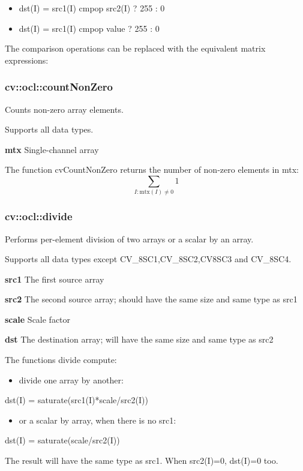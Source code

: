 \documentclass{article}
\begin{document}
\begin{itemize}
\item dst(I) = src1(I) cmpop src2(I) ? 255 : 0
\item dst(I) = src1(I) cmpop value ? 255 : 0
\end{itemize}

The comparison operations can be replaced with the equivalent matrix
expressions:

\newpage

\subsubsection{cv::ocl::countNonZero }
\label{subsubsec:mylabel12}
Counts non-zero array elements.

Supports all data types.

\textbf{mtx }Single-channel array

The function cvCountNonZero returns the number of non-zero elements in mtx:
\[
\sum\limits_{I:\mbox{mtx}(I)\ne 0} 1
\]
\newpage

\subsubsection{cv::ocl::divide}
\label{subsubsec:mylabel13}
Performs per-element division of two arrays or a scalar by an array.

Supports all data types except CV{\_}8SC1,CV{\_}8SC2,CV8SC3 and CV{\_}8SC4.

\textbf{src1 }The first source array

\textbf{src2 }The second source array; should have the same size and same
type as src1

\textbf{scale }Scale factor

\textbf{dst }The destination array; will have the same size and same type as
src2

The functions divide compute:

\begin{itemize}
\item divide one array by another:
\end{itemize}
dst(I) = saturate(src1(I)*scale/src2(I))

\begin{itemize}
\item or a scalar by array, when there is no src1:
\end{itemize}
dst(I) = saturate(scale/src2(I))

The result will have the same type as src1. When src2(I)=0, dst(I)=0 too.
\end{document}
